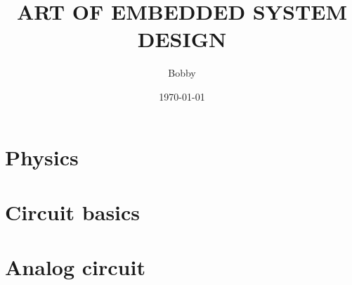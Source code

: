\documentclass[UTF8]{book}
\title{ART OF EMBEDDED SYSTEM DESIGN }
\author{Bobby}
\date{\today}
\begin{document}
	\maketitle
	\frontmatter
	
	

	\tableofcontents
	
	\mainmatter
	

	\part{Physics}
	\label{Physics}
	

	\begin{comment} 
	\chapter{Solid state physics}
	\label{Solid state physics}
	\chapter{Semiconductor physics}
	\label{Semiconductor physics}
	\end{comment}

	
	
	\part{Circuit basics}
	\label{Circuit basics}
	
	\part{Analog circuit}
	\label{Analog circuit}
	
	\begin{comment} 
	rather stupid, but helpful 
	\chapter{Transistor circuit analysis}
	\label{Transistor circuit analysis}
	\chapter{Transistor circuit design}
	\label{Transistor circuit design}
	\chapter{FET circuit analysis}
	\label{FET circuit analysis}
	\chapter{FET circuit design}
	\label{FET circuit design}
	\end{comment}
	
\end{document}
